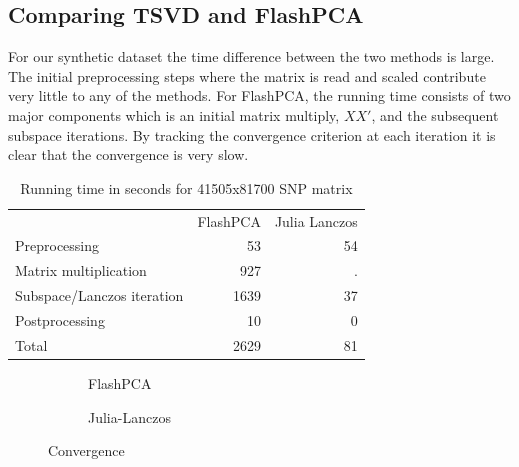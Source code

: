 \documentclass[final,leqno]{siamltex1213}
\begin{document}
\subsection{Comparing TSVD and FlashPCA}
For our synthetic dataset the time difference between the two methods is large. The initial preprocessing steps where the matrix is read and scaled contribute very little to any of the methods. For FlashPCA, the running time consists of two major components which is an initial matrix multiply, $XX'$, and the subsequent subspace iterations. By tracking the convergence criterion at each iteration it is clear that the convergence is very slow.

\begin{table}
    \caption{Running time in seconds for 41505x81700 SNP matrix}
    \centering
    \begin{tabular}{lrr}
                                   & FlashPCA & Julia Lanczos \\
        Preprocessing              &   53     & 54            \\
        Matrix multiplication      &  927     & .             \\
        Subspace/Lanczos iteration & 1639     & 37            \\
        Postprocessing             &   10     & 0             \\
        Total                      & 2629     & 81
    \end{tabular}
\end{table}

\begin{figure}
    \centering
    \begin{subfigure}{0.75\textwidth}
        \caption{FlashPCA}
    \end{subfigure}
    \begin{subfigure}{0.2\textwidth}
        \caption{Julia-Lanczos}
    \end{subfigure}
    \caption{Convergence}
\end{figure}
\end{document}
